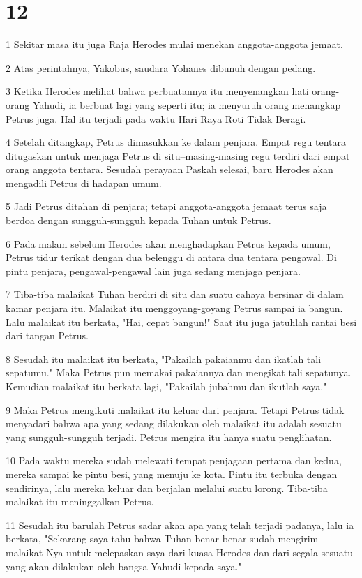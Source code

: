 \chapter{12}

\par 1 Sekitar masa itu juga Raja Herodes mulai menekan anggota-anggota jemaat.
\par 2 Atas perintahnya, Yakobus, saudara Yohanes dibunuh dengan pedang.
\par 3 Ketika Herodes melihat bahwa perbuatannya itu menyenangkan hati orang-orang Yahudi, ia berbuat lagi yang seperti itu; ia menyuruh orang menangkap Petrus juga. Hal itu terjadi pada waktu Hari Raya Roti Tidak Beragi.
\par 4 Setelah ditangkap, Petrus dimasukkan ke dalam penjara. Empat regu tentara ditugaskan untuk menjaga Petrus di situ--masing-masing regu terdiri dari empat orang anggota tentara. Sesudah perayaan Paskah selesai, baru Herodes akan mengadili Petrus di hadapan umum.
\par 5 Jadi Petrus ditahan di penjara; tetapi anggota-anggota jemaat terus saja berdoa dengan sungguh-sungguh kepada Tuhan untuk Petrus.
\par 6 Pada malam sebelum Herodes akan menghadapkan Petrus kepada umum, Petrus tidur terikat dengan dua belenggu di antara dua tentara pengawal. Di pintu penjara, pengawal-pengawal lain juga sedang menjaga penjara.
\par 7 Tiba-tiba malaikat Tuhan berdiri di situ dan suatu cahaya bersinar di dalam kamar penjara itu. Malaikat itu menggoyang-goyang Petrus sampai ia bangun. Lalu malaikat itu berkata, "Hai, cepat bangun!" Saat itu juga jatuhlah rantai besi dari tangan Petrus.
\par 8 Sesudah itu malaikat itu berkata, "Pakailah pakaianmu dan ikatlah tali sepatumu." Maka Petrus pun memakai pakaiannya dan mengikat tali sepatunya. Kemudian malaikat itu berkata lagi, "Pakailah jubahmu dan ikutlah saya."
\par 9 Maka Petrus mengikuti malaikat itu keluar dari penjara. Tetapi Petrus tidak menyadari bahwa apa yang sedang dilakukan oleh malaikat itu adalah sesuatu yang sungguh-sungguh terjadi. Petrus mengira itu hanya suatu penglihatan.
\par 10 Pada waktu mereka sudah melewati tempat penjagaan pertama dan kedua, mereka sampai ke pintu besi, yang menuju ke kota. Pintu itu terbuka dengan sendirinya, lalu mereka keluar dan berjalan melalui suatu lorong. Tiba-tiba malaikat itu meninggalkan Petrus.
\par 11 Sesudah itu barulah Petrus sadar akan apa yang telah terjadi padanya, lalu ia berkata, "Sekarang saya tahu bahwa Tuhan benar-benar sudah mengirim malaikat-Nya untuk melepaskan saya dari kuasa Herodes dan dari segala sesuatu yang akan dilakukan oleh bangsa Yahudi kepada saya."
